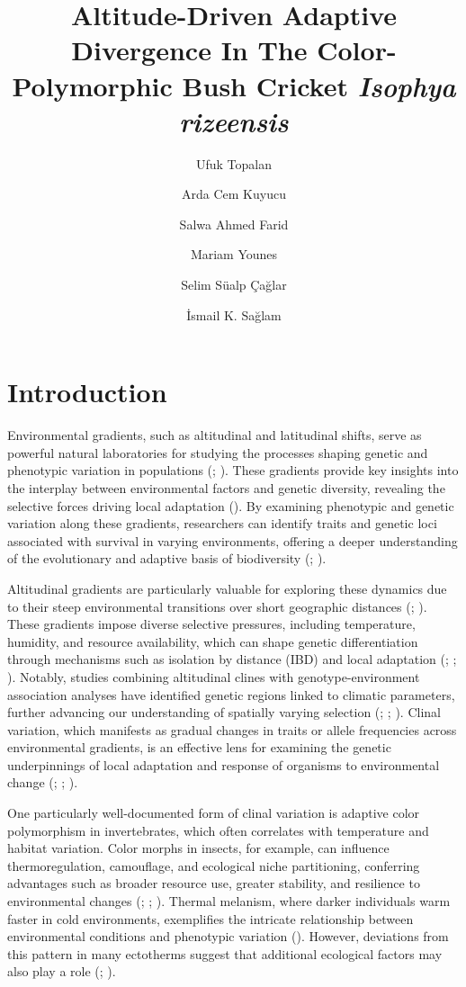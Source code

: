\documentclass[9pt,a4paper,twoside]{rho-class/rho}
\title{Altitude-Driven Adaptive Divergence In The Color-Polymorphic Bush Cricket \textit{Isophya rizeensis}
}
\author[1]{Ufuk Topalan}
\author[2]{Arda Cem Kuyucu}
\author[1]{Salwa Ahmed Farid}
\author[1]{Mariam Younes}
\author[2]{Selim Süalp Çağlar}
\author[1,$\star$]{İsmail K. Sağlam}
\affil[1]{Department of Molecular Biology and Genetics, Koç University, Istanbul, Türkiye}
\affil[2]{Department of Biology, Hacettepe University, Ankara, Türkiye}
\affil[$\star$]{corresponding author}
\begin{document}
	
    \maketitle
    \thispagestyle{firststyle}
    \linenumbers


\section{Introduction}

    Environmental gradients, such as altitudinal and latitudinal shifts, serve as powerful natural laboratories for studying the processes shaping genetic and phenotypic variation in populations (\cite{Wogan2018}; \cite{Kelly2019}). These gradients provide key insights into the interplay between environmental factors and genetic diversity, revealing the selective forces driving local adaptation (\cite{Muir2014}). By examining phenotypic and genetic variation along these gradients, researchers can identify traits and genetic loci associated with survival in varying environments, offering a deeper understanding of the evolutionary and adaptive basis of biodiversity (\cite{Merilä2014}; \cite{Waldvogel2020}).
    
    Altitudinal gradients are particularly valuable for exploring these dynamics due to their steep environmental transitions over short geographic distances (\cite{Chown2003}; \cite{Flatt2016}). These gradients impose diverse selective pressures, including temperature, humidity, and resource availability, which can shape genetic differentiation through mechanisms such as isolation by distance (IBD) and local adaptation (\cite{Sexton2014}; \cite{Stankowski2017}; \cite{Bradburd2019}). Notably, studies combining altitudinal clines with genotype-environment association analyses have identified genetic regions linked to climatic parameters, further advancing our understanding of spatially varying selection (\cite{Hancock2011}; \cite{Slatyer2014}; \cite{Pluess2016}). Clinal variation, which manifests as gradual changes in traits or allele frequencies across environmental gradients, is an effective lens for examining the genetic underpinnings of local adaptation and response of organisms to environmental change (\cite{Mayekar2022}; \cite{Tyrmi2020}; \cite{Soliani2020}).
    
    One particularly well-documented form of clinal variation is adaptive color polymorphism in invertebrates, which often correlates with temperature and habitat variation. Color morphs in insects, for example, can influence thermoregulation, camouflage, and ecological niche partitioning, conferring advantages such as broader resource use, greater stability, and resilience to environmental changes (\cite{Forsman2008}; \cite{Zeuss2014}; \cite{Kozlov2022}). Thermal melanism, where darker individuals warm faster in cold environments, exemplifies the intricate relationship between environmental conditions and phenotypic variation (\cite{Clusella-Trullas2020}). However, deviations from this pattern in many ectotherms suggest that additional ecological factors may also play a role (\cite{Karlsson2008}; \cite{Goodman2021}).
    
\end{document}
